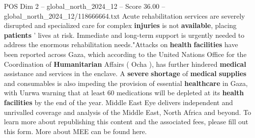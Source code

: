 \begin{textsample}{POS Dim 2 – global\_north\_2024\_12 – Score 36.00 – global\_north\_2024\_12/118666664.txt}
Acute rehabilitation services are severely disrupted and specialized care for complex \textbf{injuries} is not \textbf{available}, placing \textbf{patients} ' lives at risk.
Immediate and long-term support is urgently needed to address the enormous rehabilitation needs."Attacks on \textbf{health} \textbf{facilities} have been reported across Gaza, which according to the United Nations Office for the Coordination of \textbf{Humanitarian} Affairs ( Ocha ), has further hindered \textbf{medical} assistance and services in the enclave.
A \textbf{severe} \textbf{shortage} of \textbf{medical} \textbf{supplies} and consumables is also impeding the provision of essential \textbf{healthcare} in Gaza, with Unrwa warning that at least 60 medications will be depleted at its \textbf{health} \textbf{facilities} by the end of the year.
Middle East Eye delivers independent and unrivalled coverage and analysis of the Middle East, North Africa and beyond.
To learn more about republishing this content and the associated fees, please fill out this form.
More about MEE can be found here.

\end{textsample}
